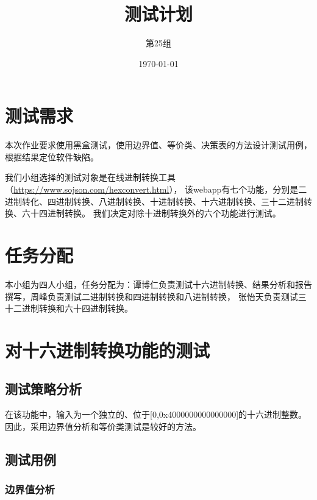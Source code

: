 \documentclass[12pt, a4paper, oneside]{ctexart}
\title{\textbf{测试计划}}
\author{第25组}
\date{\today}
\begin{document}
\maketitle
\section{测试需求}
本次作业要求使用黑盒测试，使用边界值、等价类、决策表的方法设计测试用例，根据结果定位软件缺陷。

我们小组选择的测试对象是在线进制转换工具（\url{https://www.sojson.com/hexconvert.html}），
该webapp有七个功能，分别是二进制转化、四进制转换、八进制转换、十进制转换、十六进制转换、三十二进制转换、六十四进制转换。
我们决定对除十进制转换外的六个功能进行测试。

\section{任务分配}
本小组为四人小组，任务分配为：谭博仁负责测试十六进制转换、结果分析和报告撰写，周峰负责测试二进制转换和四进制转换和八进制转换，
张怡天负责测试三十二进制转换和六十四进制转换。


\section{对十六进制转换功能的测试}

\subsection{测试策略分析}

在该功能中，输入为一个独立的、位于[0,0x4000000000000000]的十六进制整数。因此，采用边界值分析和等价类测试是较好的方法。

\subsection{测试用例}

\subsubsection{边界值分析}
\end{document}
